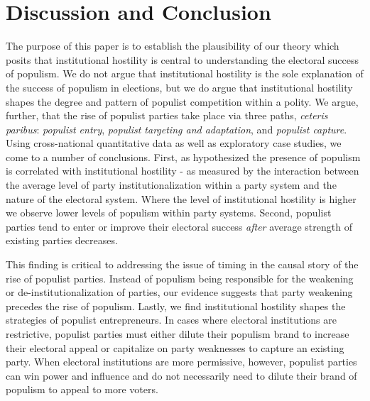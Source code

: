 \documentclass[a4paper,12pt]{article}\usepackage[]{graphicx}\usepackage[]{color}
\begin{document}
\section*{Discussion and Conclusion}
The purpose of this paper is to establish the plausibility of our theory which posits that institutional hostility is central to understanding the electoral success of populism. We do not argue that institutional hostility is the sole explanation of the success of populism in elections, but we do argue that institutional hostility shapes the degree and pattern of populist competition within a polity. We argue, further, that the rise of populist parties take place via three paths, \textit{ceteris paribus}: \textit{populist entry}, \textit{populist targeting and adaptation}, and \textit{populist capture}. Using cross-national quantitative data as well as exploratory case studies, we come to a number of conclusions. First, as hypothesized the presence of populism is correlated with institutional hostility - as measured by the interaction between the average level of party institutionalization within a party system and the nature of the electoral system. Where the level of institutional hostility is higher we observe lower levels of populism within party systems. Second, populist parties tend to enter or improve their electoral success \textit{after} average strength of existing parties decreases.
\par
This finding is critical to addressing the issue of timing in the causal story of the rise of populist parties. Instead of populism being responsible for the weakening or de-institutionalization of parties, our evidence suggests that party weakening precedes the rise of populism. Lastly, we find institutional hostility shapes the strategies of populist entrepreneurs. In cases where electoral institutions are restrictive, populist parties must either dilute their populism brand to increase their electoral appeal or capitalize on party weaknesses to capture an existing party. When electoral institutions are more permissive, however, populist parties can win power and influence and do not necessarily need to dilute their brand of populism to appeal to more voters.
\end{document}
